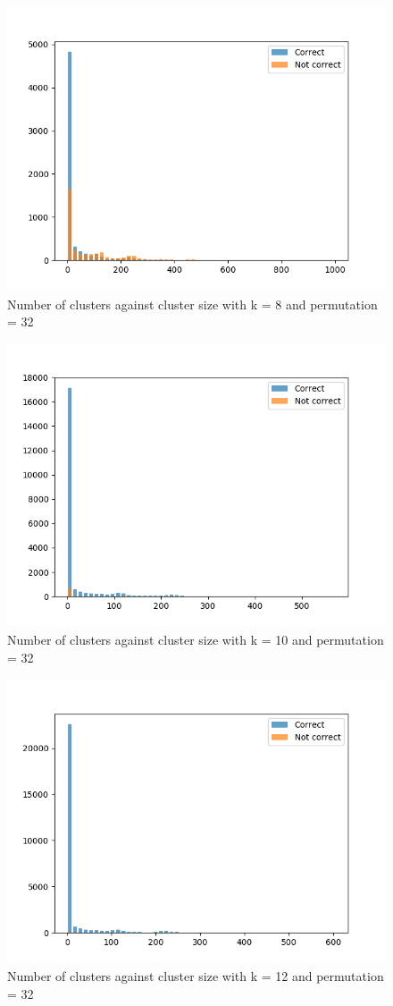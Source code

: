 \documentclass[11pt]{article}
\begin{document}
\begin{figure}[H]
	\centering
	\includegraphics[width = .8\textwidth]{virus_reads_k8_32_cluster.png}
	\caption{Number of clusters against cluster size with k = 8 and permutation = 32}
	\label{fig1}	
\end{figure}

\begin{figure}[H]
	\centering
	\includegraphics[width = .8\textwidth]{virus_reads_k10_32_cluster.png}
	\caption{Number of clusters against cluster size with k = 10 and permutation = 32}
	\label{fig1}	
\end{figure}

\begin{figure}[H]
	\centering
	\includegraphics[width = .8\textwidth]{virus_reads_k12_32_cluster.png}
	\caption{Number of clusters against cluster size with k = 12 and permutation = 32}
	\label{fig1}	
\end{figure}
\end{document}
